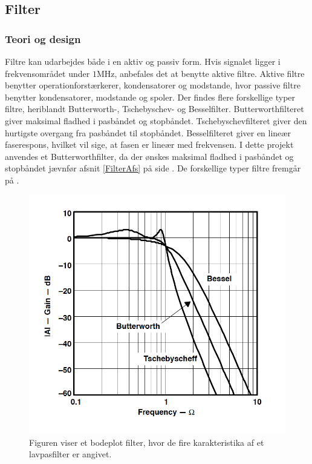\subsection{Filter}
\subsubsection{Teori og design}
Filtre kan udarbejdes både i en aktiv og passiv form. Hvis signalet ligger i frekvensområdet under $1$MHz, anbefales det at benytte aktive filtre. Aktive filtre benytter operationforstærkerer, kondensatorer og modstande, hvor passive filtre benytter kondensatorer, modstande og spoler. \cite{Carter2013} Der findes flere forskellige typer filtre, heriblandt Butterworth-, Tschebyschev- og Besselfilter. Butterworthfilteret giver maksimal fladhed i pasbåndet og stopbåndet. Tschebyschevfilteret giver den hurtigste overgang fra pasbåndet til stopbåndet. Besselfilteret giver en lineær faserespons, hvilket vil sige, at fasen er lineær med frekvensen. \cite{Carter2013} I dette projekt anvendes et Butterworthfilter, da der ønskes maksimal fladhed i pasbåndet og stopbåndet jævnfør afsnit \ref{FilterAfs} på side \pageref{FilterAfs}. De forskellige typer filtre fremgår på .
\begin{figure}[H]
	\centering
	\includegraphics[scale=0.7]{figures/cProblemloesning/type_filtre.PNG}
	\caption{Figuren viser et bodeplot filter, hvor de fire karakteristika af et lavpasfilter er angivet. \cite{Carter2013}}
	\label{fig:type_filtre}
\end{figure}
